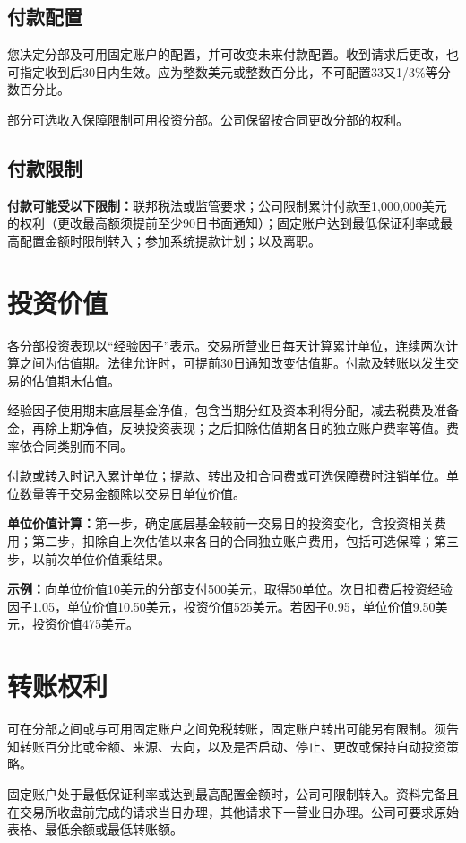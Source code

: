 \documentclass[UTF8,fontset=none,11pt,a4paper]{ctexart}
\begin{document}
\subsection*{付款配置}
您决定分部及可用固定账户的配置，并可改变未来付款配置。收到请求后更改，也可指定收到后30日内生效。应为整数美元或整数百分比，不可配置33又1/3\%等分数百分比。


部分可选收入保障限制可用投资分部。公司保留按合同更改分部的权利。


\subsection*{付款限制}
\textbf{付款可能受以下限制：}联邦税法或监管要求；公司限制累计付款至1,000,000美元的权利（更改最高额须提前至少90日书面通知）；固定账户达到最低保证利率或最高配置金额时限制转入；参加系统提款计划；以及离职。


\section*{投资价值}
各分部投资表现以“经验因子”表示。交易所营业日每天计算累计单位，连续两次计算之间为估值期。法律允许时，可提前30日通知改变估值期。付款及转账以发生交易的估值期末估值。


经验因子使用期末底层基金净值，包含当期分红及资本利得分配，减去税费及准备金，再除上期净值，反映投资表现；之后扣除估值期各日的独立账户费率等值。费率依合同类别而不同。


付款或转入时记入累计单位；提款、转出及扣合同费或可选保障费时注销单位。单位数量等于交易金额除以交易日单位价值。


\textbf{单位价值计算：}第一步，确定底层基金较前一交易日的投资变化，含投资相关费用；第二步，扣除自上次估值以来各日的合同独立账户费用，包括可选保障；第三步，以前次单位价值乘结果。


\textbf{示例：}向单位价值10美元的分部支付500美元，取得50单位。次日扣费后投资经验因子1.05，单位价值10.50美元，投资价值525美元。若因子0.95，单位价值9.50美元，投资价值475美元。


\section*{转账权利}
可在分部之间或与可用固定账户之间免税转账，固定账户转出可能另有限制。须告知转账百分比或金额、来源、去向，以及是否启动、停止、更改或保持自动投资策略。


固定账户处于最低保证利率或达到最高配置金额时，公司可限制转入。资料完备且在交易所收盘前完成的请求当日办理，其他请求下一营业日办理。公司可要求原始表格、最低余额或最低转账额。
\end{document}
